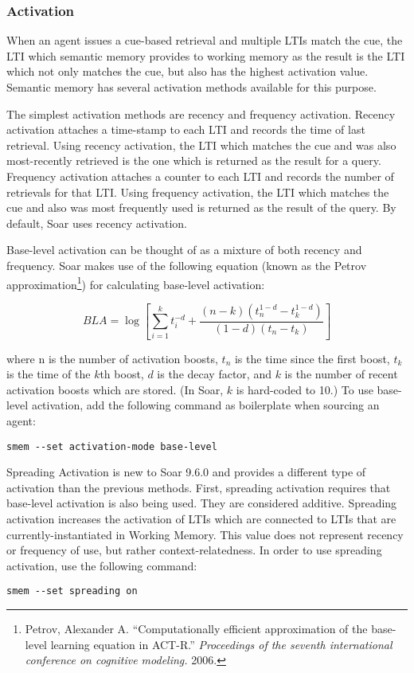 \subsubsection{Activation}
When an agent issues a cue-based retrieval and multiple LTIs match the cue, the LTI which semantic memory provides to working memory as the result is the LTI which not only matches the cue, but also has the highest activation value. Semantic memory has several activation methods available for this purpose.

The simplest activation methods are recency and frequency activation. Recency activation attaches a time-stamp to each LTI and records the time of last retrieval. Using recency activation, the LTI which matches the cue and was also most-recently retrieved is the one which is returned as the result for a query. Frequency activation attaches a counter to each LTI and records the number of retrievals for that LTI. Using frequency activation, the LTI which matches the cue and also was most frequently used is returned as the result of the query. By default, Soar uses recency activation.

Base-level activation can be thought of as a mixture of both recency and frequency. Soar makes use of the following equation (known as the Petrov approximation\footnote{Petrov, Alexander A. ``Computationally efficient approximation of the base-level learning equation in ACT-R.'' \textit{Proceedings of the seventh international conference on cognitive modeling.} 2006.}) for calculating base-level activation:

$$BLA = \log \left[ \sum\limits_{i=1}^{k} t_i^{-d} + \dfrac{(n-k)(t_n^{1-d} - t_k^{1-d})}{(1-d)(t_n-t_k)} \right]$$

where n is the number of activation boosts, $t_n$ is the time since the first boost, $t_k$ is the time of the $k$th boost, $d$ is the decay factor, and $k$ is the number of recent activation boosts which are stored. (In Soar, $k$ is hard-coded to 10.) To use base-level activation, add the following command as boilerplate when sourcing an agent:\begin{verbatim}
smem --set activation-mode base-level
\end{verbatim}

Spreading Activation is new to Soar 9.6.0 and provides a different type of activation than the previous methods. First, spreading activation requires that base-level activation is also being used. They are considered additive. Spreading activation increases the activation of LTIs which are connected to LTIs that are currently-instantiated in Working Memory. This value does not represent recency or frequency of use, but rather context-relatedness. In order to use spreading activation, use the following command:\begin{verbatim}
smem --set spreading on
\end{verbatim}

